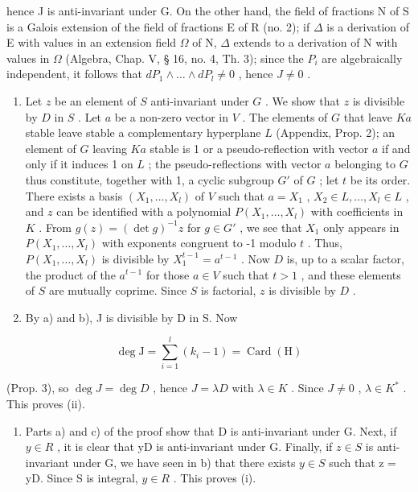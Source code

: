 hence J is anti-invariant under G. On the other hand, the field of fractions N of S is a Galois extension of the field of fractions E of R (no. 2); if \(\Delta\) is a derivation of E with values in an extension field \(\Omega\) of N, \(\Delta\) extends to a derivation of N with values in \(\Omega\) (Algebra, Chap. V, § 16, no. 4, Th. 3); since the \(P_{i}\) are algebraically independent, it follows that \(dP_{1} \wedge \ldots \wedge dP_{l} \neq 0\) , hence \(J \neq 0\) .

\begin{enumerate}
\def\labelenumi{\alph{enumi})}
\setcounter{enumi}{1}
\item
  Let \(z\) be an element of \(S\) anti-invariant under \(G\) . We show that \(z\) is divisible by \(D\) in \(S\) . Let \(a\) be a non-zero vector in \(V\) . The elements of \(G\) that leave \(Ka\) stable leave stable a complementary hyperplane \(L\) (Appendix, Prop. 2); an element of \(G\) leaving \(Ka\) stable is 1 or a pseudo-reflection with vector \(a\) if and only if it induces 1 on \(L\) ; the pseudo-reflections with vector \(a\) belonging to \(G\) thus constitute, together with 1, a cyclic subgroup \(G'\) of \(G\) ; let \(t\) be its order. There exists a basis \((X_1, \ldots, X_l)\) of \(V\) such that \(a = X_1\) , \(X_2 \in L, \ldots, X_l \in L\) , and \(z\) can be identified with a polynomial \(P(X_1, \ldots, X_l)\) with coefficients in \(K\) . From \(g(z) = (\det g)^{-1}z\) for \(g \in G'\) , we see that \(X_1\) only appears in \(P(X_1, \ldots, X_l)\) with exponents congruent to -1 modulo \(t\) . Thus, \(P(X_1, \ldots, X_l)\) is divisible by \(X_1^{t-1} = a^{t-1}\) . Now \(D\) is, up to a scalar factor, the product of the \(a^{t-1}\) for those \(a \in V\) such that \(t > 1\) , and these elements of \(S\) are mutually coprime. Since \(S\) is factorial, \(z\) is divisible by \(D\) .
\item
  By a) and b), J is divisible by D in S. Now
\end{enumerate}

\[
\deg \mathrm{J} = \sum_ {i = 1} ^ {l} (k _ {i} - 1) = \operatorname{Card} (\mathrm{H})
\]

(Prop. 3), so \(\deg J = \deg D\) , hence \(J = \lambda D\) with \(\lambda \in K\) . Since \(J \neq 0\) , \(\lambda \in K^*\) . This proves (ii).

\begin{enumerate}
\def\labelenumi{\alph{enumi})}
\setcounter{enumi}{3}
\tightlist
\item
  Parts a) and c) of the proof show that D is anti-invariant under G. Next, if \(y \in R\) , it is clear that yD is anti-invariant under G. Finally, if \(z \in S\) is anti-invariant under G, we have seen in b) that there exists \(y \in S\) such that z = yD. Since S is integral, \(y \in R\) . This proves (i).
\end{enumerate}
